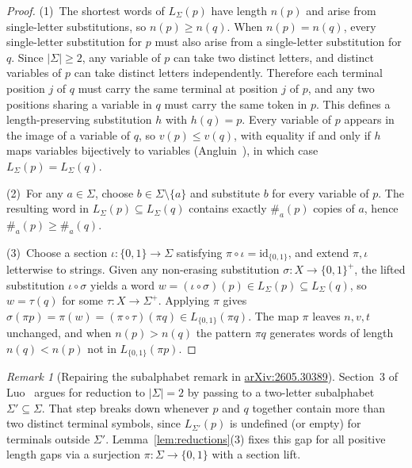 \documentclass[11pt]{article}
\theoremstyle{plain}
\theoremstyle{definition}
\theoremstyle{remark}
\newtheorem{remark}{Remark}
\begin{document}
\begin{proof}
(1)~The shortest words of $L_\Sigma(p)$ have length $n(p)$ and arise from single-letter substitutions, so $n(p) \ge n(q)$.
When $n(p) = n(q)$, every single-letter substitution for $p$ must also arise from a single-letter substitution for $q$.
Since $|\Sigma| \ge 2$, any variable of $p$ can take two distinct letters, and distinct variables of $p$ can take distinct letters independently.
Therefore each terminal position $j$ of $q$ must carry the same terminal at position $j$ of $p$, and any two positions sharing a variable in $q$ must carry the same token in $p$.
This defines a length-preserving substitution $h$ with $h(q) = p$.
Every variable of $p$ appears in the image of a variable of $q$, so $v(p) \le v(q)$, with equality if and only if $h$ maps variables bijectively to variables (Angluin~\cite{Angluin1980}), in which case $L_\Sigma(p) = L_\Sigma(q)$.

(2)~For any $a \in \Sigma$, choose $b \in \Sigma \setminus \{a\}$ and substitute $b$ for every variable of $p$. The resulting word in $L_\Sigma(p) \subseteq L_\Sigma(q)$ contains exactly $\#_a(p)$ copies of $a$, hence $\#_a(p) \ge \#_a(q)$.

(3)~Choose a section $\iota \colon \{0,1\} \to \Sigma$ satisfying $\pi \circ \iota = \mathrm{id}_{\{0,1\}}$, and extend $\pi, \iota$ letterwise to strings.
Given any non-erasing substitution $\sigma \colon X \to \{0,1\}^+$, the lifted substitution $\iota \circ \sigma$ yields a word $w = (\iota \circ \sigma)(p) \in L_\Sigma(p) \subseteq L_\Sigma(q)$, so $w = \tau(q)$ for some $\tau \colon X \to \Sigma^+$.
Applying $\pi$ gives $\sigma(\pi p) = \pi(w) = (\pi \circ \tau)(\pi q) \in L_{\{0,1\}}(\pi q)$.
The map $\pi$ leaves $n, v, t$ unchanged, and when $n(p) > n(q)$ the pattern $\pi q$ generates words of length $n(q) < n(p)$ not in $L_{\{0,1\}}(\pi p)$.
\end{proof}

\begin{remark}[Repairing the subalphabet remark in \href{https://arxiv.org/abs/2605.30389}{arXiv:2605.30389}]
Section~3 of Luo~\cite{Luo2026} argues for reduction to $|\Sigma| = 2$ by passing to a two-letter subalphabet $\Sigma' \subseteq \Sigma$. That step breaks down whenever $p$ and $q$ together contain more than two distinct terminal symbols, since $L_{\Sigma'}(p)$ is undefined (or empty) for terminals outside $\Sigma'$. Lemma~\ref{lem:reductions}(3) fixes this gap for all positive length gaps via a surjection $\pi \colon \Sigma \to \{0,1\}$ with a section lift.
\end{remark}
\end{document}
